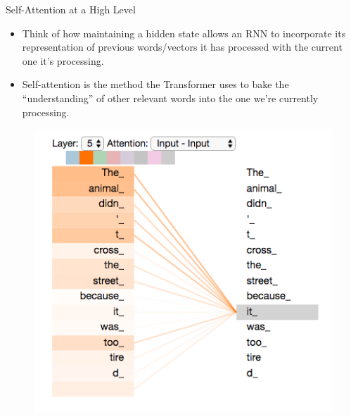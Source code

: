 \documentclass[handout]{beamer}
\begin{document}
\begin{frame}{Self-Attention at a High Level}
\begin{scriptsize}



\begin{itemize}


\item Think of how maintaining a hidden state allows an RNN to incorporate its representation of previous words/vectors it has processed with the current one it's processing. 

\item Self-attention is the method the Transformer uses to bake the ``understanding'' of other relevant words into the one we're currently processing.


\end{itemize}

\end{scriptsize}

\begin{figure}[h]
        	\includegraphics[scale = 0.35]{pics/transformer_self-attention_visualization.png}
        \end{figure}  


\end{frame}
\end{document}
